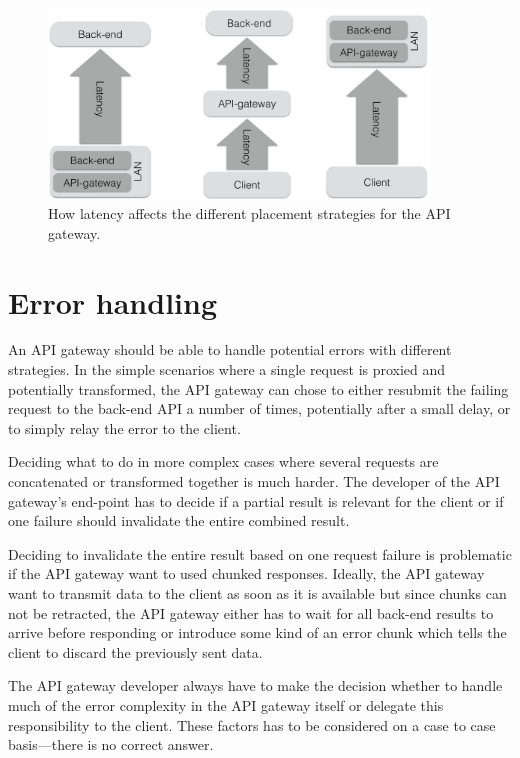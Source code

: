 \documentclass{cslthse-msc}
\begin{document}
\begin{figure}[H]
  \centering
    \begin{center}
      \includegraphics[width=0.9\textwidth]{images/api_gateway_latency.png}
    \end{center}
  \caption{How latency affects the different placement strategies for the API gateway.}
\end{figure}

\section{Error handling}
An API gateway should be able to handle potential errors with different strategies. In the simple scenarios where a single request is proxied and potentially transformed, the API gateway can chose to either resubmit the failing request to the back-end API a number of times, potentially after a small delay, or to simply relay the error to the client.

Deciding what to do in more complex cases where several requests are concatenated or transformed together is much harder. The developer of the API gateway's end-point has to decide if a partial result is relevant for the client or if one failure should invalidate the entire combined result.

Deciding to invalidate the entire result based on one request failure is problematic if the API gateway want to used chunked responses. Ideally, the API gateway want to transmit data to the client as soon as it is available but since chunks can not be retracted, the API gateway either has to wait for all back-end results to arrive before responding or introduce some kind of an error chunk which tells the client to discard the previously sent data.

The API gateway developer always have to make the decision whether to handle much of the error complexity in the API gateway itself or delegate this responsibility to the client. These factors has to be considered on a case to case basis---there is no correct answer.
\end{document}
